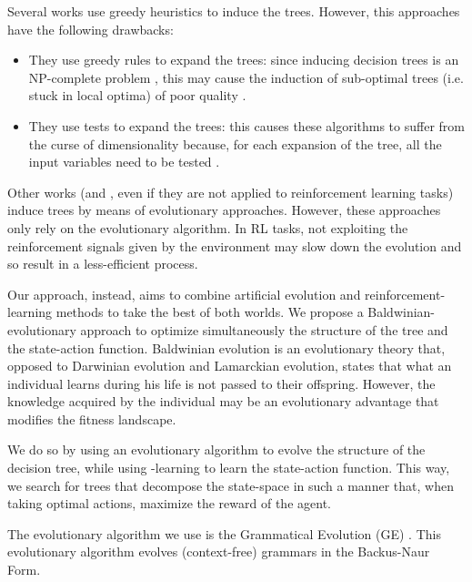 \documentclass[review,english]{elsarticle}
\begin{document}
Several works \cite{roth_conservative_2019, mccallum_1996_reinforcement, uther1998tree, pyeatt2001decision} use greedy heuristics to induce the trees. However, this approaches have the following drawbacks:
\begin{itemize}
    \item They use greedy rules to expand the trees: since inducing decision trees is an NP-complete problem \cite{hyafil_constructing_1976}, this may cause the induction of sub-optimal trees (i.e. stuck in local optima) of poor quality \cite{mccallum_1996_reinforcement, fan_regression_2005}.
    \item They use tests to expand the trees: this causes these algorithms to suffer from the curse of dimensionality because, for each expansion of the tree, all the input variables need to be tested \cite{mccallum_1996_reinforcement, uther1998tree}.
\end{itemize}

Other works \cite{di_chio_evolving_2011} (and \cite{kretowski_memetic_2008, czajkowski_multi-objective_2019, llora_evolution_nodate, llora_knowledge-independent_nodate}, even if they are not applied to reinforcement learning tasks) induce trees by means of evolutionary approaches. 
However, these approaches only rely on the evolutionary algorithm. 
In RL tasks, not exploiting the reinforcement signals given by the environment may slow down the evolution and so result in a less-efficient process.


Our approach, instead, aims to combine artificial evolution and reinforcement-learning methods to take the best of both worlds.
We propose a Baldwinian-evolutionary approach to optimize simultaneously the structure of the tree and the state-action function.
Baldwinian evolution is an evolutionary theory that, opposed to Darwinian evolution and Lamarckian evolution, states that what an individual learns during his life is not passed to their offspring. However, the knowledge acquired by the individual may be an evolutionary advantage that modifies the fitness landscape.

We do so by using an evolutionary algorithm to evolve the structure of the decision tree, while using -learning to learn the state-action function.
This way, we search for trees that decompose the state-space in such a manner that, when taking optimal actions, maximize the reward of the agent. 

The evolutionary algorithm we use is the Grammatical Evolution (GE) \cite{goos_grammatical_1998}. This evolutionary algorithm evolves (context-free) grammars in the Backus-Naur Form.
\end{document}
